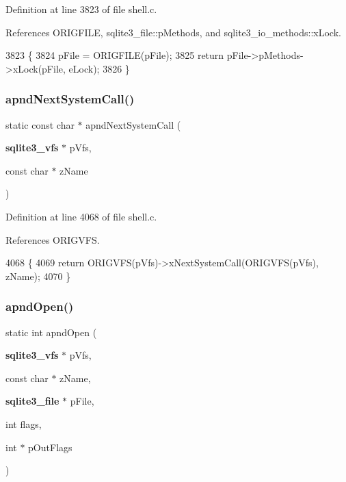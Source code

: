 Definition at line 3823 of file shell.\+c.



References O\+R\+I\+G\+F\+I\+LE, sqlite3\+\_\+file\+::p\+Methods, and sqlite3\+\_\+io\+\_\+methods\+::x\+Lock.


\begin{DoxyCode}
3823                                                    \{
3824   pFile = ORIGFILE(pFile);
3825   \textcolor{keywordflow}{return} pFile->pMethods->xLock(pFile, eLock);
3826 \}
\end{DoxyCode}
\mbox{\label{shell_8c_a8bcbf0e9abb879f9eb2d372dbf2f99b4}} 
\subsubsection{apnd\+Next\+System\+Call()}
{\footnotesize\ttfamily static const char $\ast$ apnd\+Next\+System\+Call (\begin{DoxyParamCaption}\item[{\textbf{ sqlite3\+\_\+vfs} $\ast$}]{p\+Vfs,  }\item[{const char $\ast$}]{z\+Name }\end{DoxyParamCaption})\hspace{0.3cm}{\ttfamily [static]}}



Definition at line 4068 of file shell.\+c.



References O\+R\+I\+G\+V\+FS.


\begin{DoxyCode}
4068                                                                            \{
4069   \textcolor{keywordflow}{return} ORIGVFS(pVfs)->xNextSystemCall(ORIGVFS(pVfs), zName);
4070 \}
\end{DoxyCode}
\mbox{\label{shell_8c_a259c60ec576d3eaf098ed090009a4e8b}} 
\subsubsection{apnd\+Open()}
{\footnotesize\ttfamily static int apnd\+Open (\begin{DoxyParamCaption}\item[{\textbf{ sqlite3\+\_\+vfs} $\ast$}]{p\+Vfs,  }\item[{const char $\ast$}]{z\+Name,  }\item[{\textbf{ sqlite3\+\_\+file} $\ast$}]{p\+File,  }\item[{int}]{flags,  }\item[{int $\ast$}]{p\+Out\+Flags }\end{DoxyParamCaption})\hspace{0.3cm}{\ttfamily [static]}}



